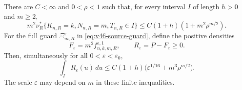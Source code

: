 \begin{lemma}
\label{lem:v54-fixed-band-windows}
There are $C<\infty$ and $0<\rho<1$ such that, for every interval
$I$ of length $h>0$ and $m\ge2$,
\begin{equation}\label{eq:v54-unmarked-window}
 m^2\nu_R^*\{K_{n,R}=k,N_{n,R}=m,T_{n,R}\in I\}
       \le C(1+h)(1+m^2\rho^{m/2}).
\end{equation}
For the full guard $\Xi_{m,R}^{\varepsilon}$ in
\eqref{eq:v46-source-guard}, define the positive densities
\begin{equation}\label{eq:v54-positive-guard-split}
 F_\varepsilon=m^2f^{\varepsilon,1}_{n,k,m,R},\qquad
 R_\varepsilon=P-F_\varepsilon\ge0.
\end{equation}
Then, simultaneously for all $0<\varepsilon<\varepsilon_0$,
\begin{equation}\label{eq:v54-all-margin-window}
 \int_I R_\varepsilon(u)\,du
 \le C(1+h)\bigl(\varepsilon^{1/16}+m^3\rho^{m/2}\bigr).
\end{equation}
The scale $\varepsilon$ may depend on $m$ in these finite inequalities.
\end{lemma}
